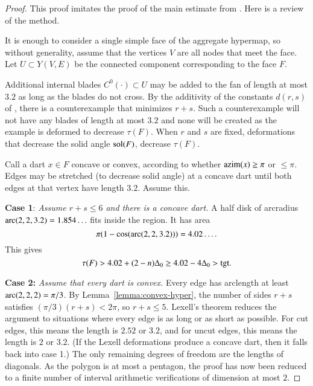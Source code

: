\begin{proof} This proof imitates the proof of the main estimate from \cite{Hales:2006:DCG}.    Here is a review of the method.

It is enough to consider a single simple face of the aggregate hypermap, so without generality,   assume that the vertices $V$ are all nodes that meet the face.  Let $U\subset Y(V,E)$ be the connected component corresponding to the face $F$.

Additional internal blades $C^0(\cdot)\subset U$ may be added to the fan of length at most $3.2$ as long as the blades do not cross.  By the additivity of the constants $d(r,s)$ of , there is a counterexample that minimizes $r+s$.  Such a counterexample will not have any blades of length at most $3.2$ and none will be created as the example is deformed to decrease $\tau(F)$.  When $r$ and $s$ are fixed, deformations that decrease the solid angle $\operatorname{sol}(F)$, decrease $\tau(F)$.

Call a dart $x\in F$ concave or convex, according to whether ${\operatorname{azim}}(x)\ge\pi$ or $\le\pi$.  Edges may be stretched (to decrease solid angle) at a concave dart until both edges at that vertex have length $3.2$. Assume this.

{\bf Case 1}:
{\it Assume $r+s\le6$ and there is a concave dart.}  A half disk of arcradius $\operatorname{arc}(2,2,3.2)=1.854\ldots$ fits inside the region.  It has area
$$\pi(1-\cos(\operatorname{arc}(2,2,3.2)))=4.02\ldots.$$
This gives
$$\tau(F) > 4.02 + (2-n)\Delta_0 \ge 4.02 -4 \Delta_0 > {\operatorname{tgt}}.$$

{\bf Case 2:}
{\it Assume that every dart is convex.}
Every edge has arclength at least $\operatorname{arc}(2,2,2)=\pi/3$.  By Lemma~\ref{lemma:convex-hyper}, the number of sides $r+s$ satisfies $(\pi/3)(r+s) < 2\pi$, so $r+s\le5$.  Lexell's theorem reduces the argument to situations where every edge is as long or as short as possible.  For cut edges, this means the length is $2.52$ or $3.2$, and for uncut edges, this means the length is $2$ or $3.2$.  (If the Lexell deformations produce a concave dart, then it falls back into case 1.)  The only remaining degrees of freedom are the lengths of diagonals.  As the polygon is at most a pentagon, the proof has now been reduced to a finite number of interval arithmetic verifications of dimension at most $2$.


\end{proof}
